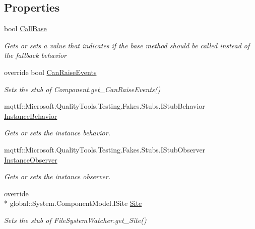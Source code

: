 \subsection*{Properties}
\begin{DoxyCompactItemize}
\item 
bool \hyperlink{class_system_1_1_i_o_1_1_fakes_1_1_stub_file_system_watcher_a5c5900d337108fee25505aa0b658b06c}{Call\-Base}
\begin{DoxyCompactList}\small\item\em Gets or sets a value that indicates if the base method should be called instead of the fallback behavior\end{DoxyCompactList}\item 
override bool \hyperlink{class_system_1_1_i_o_1_1_fakes_1_1_stub_file_system_watcher_a1315c288080ce372c7c609539884022b}{Can\-Raise\-Events}
\begin{DoxyCompactList}\small\item\em Sets the stub of Component.\-get\-\_\-\-Can\-Raise\-Events()\end{DoxyCompactList}\item 
mqttf\-::\-Microsoft.\-Quality\-Tools.\-Testing.\-Fakes.\-Stubs.\-I\-Stub\-Behavior \hyperlink{class_system_1_1_i_o_1_1_fakes_1_1_stub_file_system_watcher_adfb177b1f59a750f5aa5ecec7ae9309b}{Instance\-Behavior}
\begin{DoxyCompactList}\small\item\em Gets or sets the instance behavior.\end{DoxyCompactList}\item 
mqttf\-::\-Microsoft.\-Quality\-Tools.\-Testing.\-Fakes.\-Stubs.\-I\-Stub\-Observer \hyperlink{class_system_1_1_i_o_1_1_fakes_1_1_stub_file_system_watcher_ac28ceae553b1915f9237825081847020}{Instance\-Observer}
\begin{DoxyCompactList}\small\item\em Gets or sets the instance observer.\end{DoxyCompactList}\item 
override \\*
global\-::\-System.\-Component\-Model.\-I\-Site \hyperlink{class_system_1_1_i_o_1_1_fakes_1_1_stub_file_system_watcher_ac104c4ba44f9b7f4b4760553d30417cf}{Site}
\begin{DoxyCompactList}\small\item\em Sets the stub of File\-System\-Watcher.\-get\-\_\-\-Site()\end{DoxyCompactList}\end{DoxyCompactItemize}


